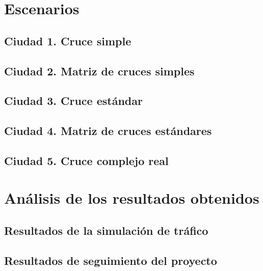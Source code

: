 \chapter{Escenarios}
    \label{chap:six}
    
\section{Ciudad 1. Cruce simple}
\section{Ciudad 2. Matriz de cruces simples}
\section{Ciudad 3. Cruce estándar}
\section{Ciudad 4. Matriz de cruces estándares}
\section{Ciudad 5. Cruce complejo real}


\chapter{Análisis de los resultados obtenidos}
    \label{chap:seven}
    
\section{Resultados de la simulación de tráfico}

\newpage
\section{Resultados de seguimiento del proyecto}
